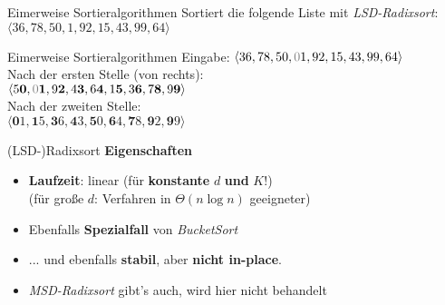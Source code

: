 \begin{frame}{Eimerweise Sortieralgorithmen}
	Sortiert die folgende Liste mit \emph{LSD-Radixsort}:  $\langle 36, 78, 50, 1, 92, 15, 43, 99, 64 \rangle$
\end{frame}

\begin{frame}{Eimerweise Sortieralgorithmen}
	\solutionheading \medskip
	Eingabe:  $\langle 36, 78, 50, \gray{0}1, 92, 15, 43, 99, 64 \rangle$
	\\[0,25cm]
	Nach der ersten Stelle (von rechts): \\ $\langle 5\textbf{0}, \gray{0}\textbf{1}, 9\textbf{2}, 4\textbf{3}, 6\textbf{4}, 1\textbf{5}, 3\textbf{6}, 7\textbf{8}, 9\textbf{9} \rangle$
	\\[0,25cm]
	Nach der zweiten Stelle: \\ $\langle \textbf{0}1, \textbf{1}5, \textbf{3}6, \textbf{4}3, \textbf{5}0, \textbf{6}4, \textbf{7}8, \textbf{9}2, \textbf{9}9 \rangle$
\end{frame}

\begin{frame}{(LSD-)Radixsort}
	\textbf{Eigenschaften}  \\
	\begin{itemize}
		\item \textbf{Laufzeit}: linear (für \textbf{konstante} $d$ \textbf{und} $K$!) \\
		\pause
		(für große $d$: Verfahren in $\Theta(n \log n)$ geeigneter)
		\pause
		\item Ebenfalls \textbf{Spezialfall} von \emph{BucketSort}
		\pause
		\item ... und ebenfalls \textbf{stabil}, aber \textbf{nicht in-place}.
		\pause
		\item \emph{MSD-Radixsort} gibt's auch, wird hier nicht behandelt
	\end{itemize}
\end{frame}

